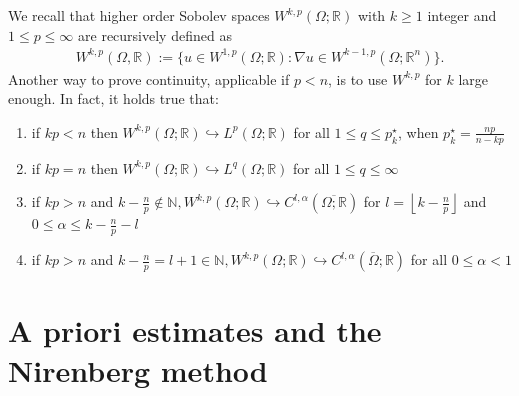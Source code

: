 We recall that higher order Sobolev spaces \(W^{k,p}(\Omega; \mathbb{R})\) with \(k \geq 1\) integer and \(1 \leq p \leq \infty \) are recursively defined as
\begin{gather}
	W^{k,p}(\Omega, \mathbb{R}):= \{ u \in W^{1,p}(\Omega; \mathbb{R}): \nabla u \in W^{k-1,p}(\Omega; \mathbb{R}^{n})\}.
\end{gather}
Another way to prove continuity, applicable if \(p < n\), is to use \(W^{k,p}\) for \(k\) large enough. In fact, it holds true that:
\begin{enumerate}[label= (\arabic*)]
	\item if \(kp<n\) then \(W^{k,p}(\Omega; \mathbb{R})\hookrightarrow L^{p}(\Omega;\mathbb{R})\) for all \(1 \leq q \leq p_{k}^{\star}\), when \(p_{k}^{\star}=\frac{np}{n-kp}\)
	\item if \(kp=n\) then \(W^{k,p}(\Omega; \mathbb{R}) \hookrightarrow L^{q}(\Omega; \mathbb{R}) \) for all \( 1 \leq q\leq \infty \)
	\item if \( kp > n \) and \( k-\frac{n}{p}\notin \mathbb{N}, W^{k,p}(\Omega;\mathbb{R}) \hookrightarrow C^{l,\alpha}(\overline{\Omega; \mathbb{R}})\) for \( l= \left\lfloor k-\frac{n}{p} \right\rfloor  \) and \( 0 \leq \alpha\leq k-\frac{n}{p}-l \)
	\item if \( kp> n \) and \( k-\frac{n}{p}=l+1 \in \mathbb{N}, W^{k,p}(\Omega; \mathbb{R}) \hookrightarrow C^{l,\alpha} (\overline{\Omega}; \mathbb{R})\) for all \( 0 \leq \alpha < 1 \)
\end{enumerate}

\section{A priori estimates and the Nirenberg method}

